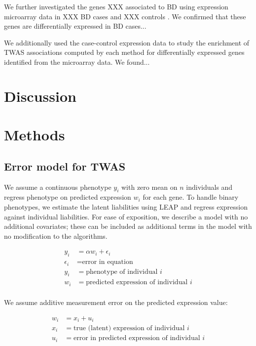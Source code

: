 \documentclass{article}
\begin{document}
We further investigated the genes XXX associated to BD using expression
microarray data in XXX BD cases and XXX controls \cite{xxx}. We confirmed that
these genes are differentially expressed in BD cases...

We additionally used the case-control expression data to study the enrichment
of TWAS associations computed by each method for differentially expressed genes
identified from the microarray data. We found...

\section{Discussion}


\section{Methods}

\subsection{Error model for TWAS}

We assume a continuous phenotype $y_i$ with zero mean on $n$ individuals and
regress phenotype on predicted expression $w_i$ for each gene. To handle binary
phenotypes, we estimate the latent liabilities using
LEAP\cite{10.1038/nmeth.3285} and regress expression against individual
liabilities. For ease of exposition, we describe a model with no additional
covariates; these can be included as additional terms in the model with no
modification to the algorithms.

\begin{align*}
  y_i &= \alpha w_i + \epsilon_i\\
  \epsilon_i &= \text{error in equation}\\
  y_i &= \text{phenotype of individual $i$}\\
  w_i &= \text{predicted expression of individual $i$}\\
\end{align*}

We assume additive measurement error on the predicted expression value:

\begin{align*}
  w_i &= x_i + u_i\\
  x_i &= \text{true (latent) expression of individual $i$}\\
  u_i &= \text{error in predicted expression of individual $i$}\\
\end{align*}
\end{document}
